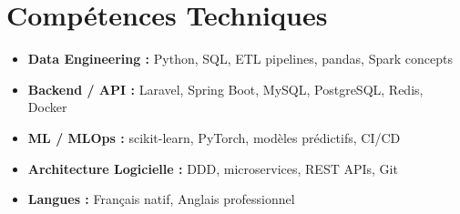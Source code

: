 \documentclass[a4paper,11pt]{article}
\begin{document}
\section{Comp\'etences Techniques}
\begin{itemize}[leftmargin=0.5cm, nosep]
    \item \textbf{Data Engineering :} Python, SQL, ETL pipelines, pandas, Spark concepts
    \item \textbf{Backend / API :} Laravel, Spring Boot, MySQL, PostgreSQL, Redis, Docker
    \item \textbf{ML / MLOps :} scikit-learn, PyTorch, mod\`eles pr\'edictifs, CI/CD
    \item \textbf{Architecture Logicielle :} DDD, microservices, REST APIs, Git
    \item \textbf{Langues :} Fran\c{c}ais natif, Anglais professionnel
\end{itemize}
\end{document}
